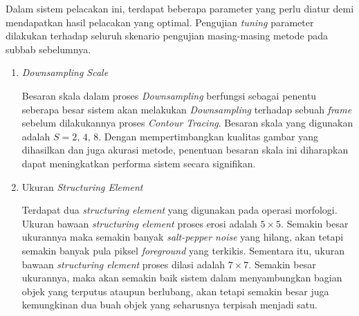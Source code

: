     Dalam sistem pelacakan ini, terdapat beberapa parameter yang perlu diatur demi mendapatkan hasil pelacakan yang optimal. Pengujian \textit{tuning} parameter dilakukan terhadap seluruh skenario pengujian masing-masing metode pada subbab sebelumnya.
        \begin{enumerate}
            \item \textit{Downsampling Scale}
            
            Besaran skala dalam proses \textit{Downsampling} berfungsi sebagai penentu seberapa besar sistem akan melakukan \textit{Downsampling} terhadap sebuah \textit{frame} sebelum dilakukannya proses \textit{Contour Tracing}. Besaran skala yang digunakan adalah $S = 2,\, 4,\, 8$. Dengan mempertimbangkan kualitas gambar yang dihasilkan dan juga akurasi metode, penentuan besaran skala ini diharapkan dapat meningkatkan performa sistem secara signifikan.
            
            \item Ukuran \textit{Structuring Element}
            
            Terdapat dua \textit{structuring element} yang digunakan pada operasi morfologi. Ukuran bawaan \textit{structuring element} proses erosi adalah $5 \times 5$. Semakin besar ukurannya maka semakin banyak \textit{salt-pepper noise} yang hilang, akan tetapi semakin banyak pula piksel \textit{foreground} yang terkikis. Sementara itu,  ukuran bawaan \textit{structuring element} proses dilasi adalah $7 \times 7$. Semakin besar ukurannya, maka akan semakin baik sistem dalam menyambungkan bagian objek yang terputus ataupun berlubang, akan tetapi semakin besar juga kemungkinan dua buah objek yang seharusnya terpisah menjadi satu.
        \end{enumerate}
    
        
    

